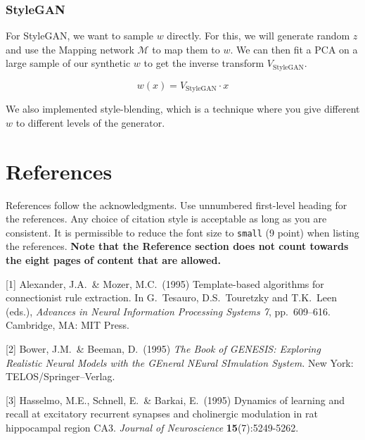 \documentclass{article}
\begin{document}
\subsubsection*{StyleGAN}

For StyleGAN, we want to sample $w$ directly. For this, we will generate random $z$ and use the Mapping network $\mathcal{M}$ to map them to $w$.
We can then fit a PCA on a large sample of our synthetic $w$ to get the inverse transform $V_{\text{StyleGAN}}$.

\[w(x) = V_{\text{StyleGAN}} \cdot x\]

We also implemented style-blending, which is a technique where you give different $w$ to different levels of the generator.


\section*{References}

References follow the acknowledgments. Use unnumbered first-level heading for
the references. Any choice of citation style is acceptable as long as you are
consistent. It is permissible to reduce the font size to \verb+small+ (9 point)
when listing the references.
{\bf Note that the Reference section does not count towards the eight pages of content that are allowed.}
\medskip

\small

[1] Alexander, J.A.\ \& Mozer, M.C.\ (1995) Template-based algorithms for
connectionist rule extraction. In G.\ Tesauro, D.S.\ Touretzky and T.K.\ Leen
(eds.), {\it Advances in Neural Information Processing Systems 7},
pp.\ 609--616. Cambridge, MA: MIT Press.

[2] Bower, J.M.\ \& Beeman, D.\ (1995) {\it The Book of GENESIS: Exploring
  Realistic Neural Models with the GEneral NEural SImulation System.}  New York:
TELOS/Springer--Verlag.

[3] Hasselmo, M.E., Schnell, E.\ \& Barkai, E.\ (1995) Dynamics of learning and
recall at excitatory recurrent synapses and cholinergic modulation in rat
hippocampal region CA3. {\it Journal of Neuroscience} {\bf 15}(7):5249-5262.
\end{document}
